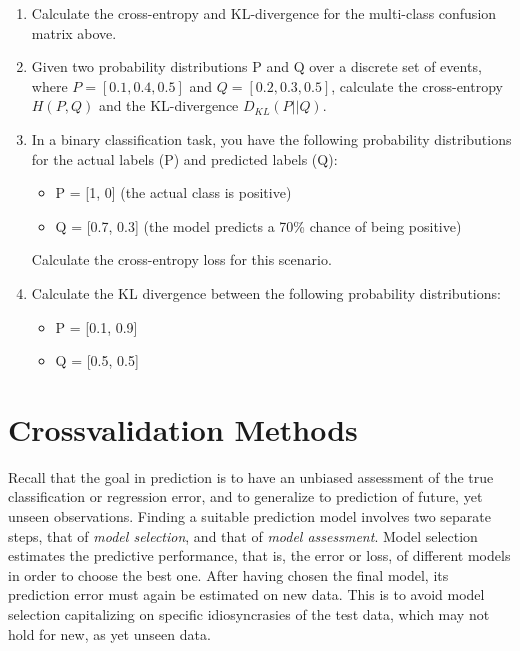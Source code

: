 \begin{tcolorbox}[colback=code]
\begin{enumerate}
\vspace{1.5\baselineskip}
  \item Calculate the cross-entropy and KL-divergence for the multi-class confusion matrix above.
  \vspace{.5\baselineskip}
  \item Given two probability distributions P and Q over a discrete set of events, where $P = [0.1, 0.4, 0.5]$ and $Q = [0.2, 0.3, 0.5]$, calculate the cross-entropy $H(P, Q)$ and the KL-divergence $D_{KL}(P || Q)$.
  \vspace{.5\baselineskip}
  \item In a binary classification task, you have the following probability distributions for the actual labels (P) and predicted labels (Q):
\begin{itemize}
  \item P = [1, 0] (the actual class is positive)
  \item Q = [0.7, 0.3] (the model predicts a 70\% chance of being positive)
\end{itemize}
Calculate the cross-entropy loss for this scenario.

\vspace{.5\baselineskip}
  \item Calculate the KL divergence between the following probability distributions:
  \begin{itemize}
     \item P = [0.1, 0.9]
     \item Q = [0.5, 0.5]
  \end{itemize}

\end{enumerate}
\end{tcolorbox}

\section{Crossvalidation Methods}

Recall that the goal in prediction is to have an unbiased assessment of the true classification or regression error, and to generalize to prediction of future, yet unseen observations. Finding a suitable prediction model involves two separate steps, that of \emph{model selection}, and that of \emph{model assessment}. Model selection estimates the predictive performance, that is, the error or loss, of different models in order to choose the best one. After having chosen the final model, its prediction error must again be estimated on new data. This is to avoid model selection capitalizing on specific idiosyncrasies of the test data, which may not hold for new, as yet unseen data.

